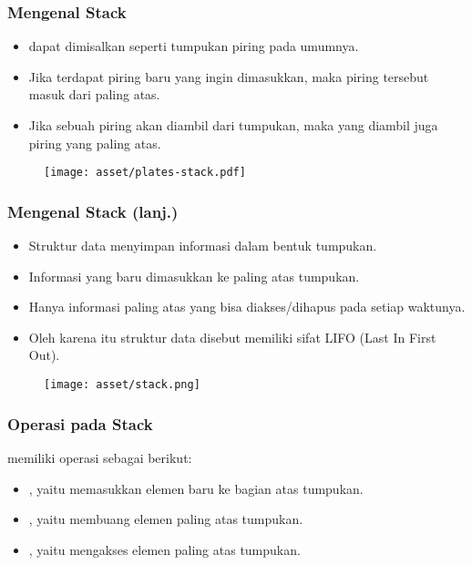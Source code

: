 \begin{frame}
\frametitle{Mengenal Stack}
\begin{itemize}
  \item {} dapat dimisalkan seperti tumpukan piring pada umumnya.
  \item Jika terdapat piring baru yang ingin dimasukkan, maka piring tersebut masuk dari paling atas.
  \item Jika sebuah piring akan diambil dari tumpukan, maka yang diambil juga piring yang paling atas.
\end{itemize}

\begin{figure}
  \centering
  \texttt{[image: asset/plates-stack.pdf]}
\end{figure}
\end{frame}

\begin{frame}
\frametitle{Mengenal Stack (lanj.)}
\begin{itemize}
  \item Struktur data  menyimpan informasi dalam bentuk tumpukan.
  \item Informasi yang baru dimasukkan ke paling atas tumpukan.
  \item Hanya informasi paling atas yang bisa diakses/dihapus pada setiap waktunya.
  \item Oleh karena itu struktur data  disebut memiliki sifat LIFO (Last In First Out).
\end{itemize}
\begin{figure}
  \centering
  \texttt{[image: asset/stack.png]}
\end{figure}
\end{frame}

\begin{frame}
\frametitle{Operasi pada Stack}

 memiliki operasi sebagai berikut:
\begin{itemize}
  \item {}, yaitu memasukkan elemen baru ke bagian atas tumpukan.
  \item {}, yaitu membuang elemen paling atas tumpukan.
  \item {}, yaitu mengakses elemen paling atas tumpukan.
\end{itemize}
\end{frame}

